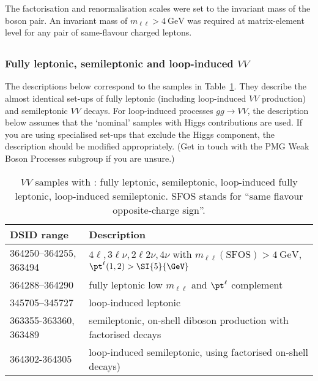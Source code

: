 The factorisation and renormalisation scales were set to the invariant mass of
the boson pair. An invariant mass of $m_{\ell\ell} > \SI{4}{\GeV}$ was required
at matrix-element level for any pair of same-flavour charged leptons.


\subsection[Sherpa]{\SHERPA}

\subsubsection{Fully leptonic, semileptonic and loop-induced \texorpdfstring{$VV$}{VV}}

The descriptions below correspond to the samples in
Table~\ref{tab:MB-sherpa}. They describe the almost
identical set-ups of fully leptonic (including loop-induced $VV$ production)
and semileptonic $VV$ decays. For loop-induced processes $gg\to VV$, 
the description below assumes that the `nominal' samples with 
Higgs contributions are used. If you are using specialised set-ups that
exclude the Higgs component, the description should be modified appropriately.
(Get in touch with the PMG Weak Boson Processes subgroup if you are unsure.)

\begin{table}[htbp]
  \caption{$VV$ samples with \SHERPA: fully leptonic, semileptonic,
    loop-induced fully leptonic, loop-induced semileptonic. SFOS stands for
    \enquote{same flavour opposite-charge sign}.}%
  \label{tab:MB-sherpa}
  \centering
  \begin{tabular}{l l}
    \toprule
    DSID range & Description \\
    \midrule
    364250--364255, 363494   & $4\ell, 3\ell\nu, 2\ell 2\nu, 4\nu$ with $m_{\ell\ell}\mathrm{(SFOS)} > \SI{4}{\GeV}$, $\pt^\ell(1,2) > \SI{5}{\GeV}$\\
    364288--364290 & fully leptonic low $m_{\ell\ell}$ and $\pt^\ell$ complement\\
    \midrule
    345705--345727   & loop-induced leptonic\\
    \midrule
    363355-363360, 363489   & semileptonic, on-shell diboson production with factorised decays\\
    \midrule
    364302-364305   & loop-induced semileptonic, using factorised on-shell decays)\\
    \bottomrule
  \end{tabular}
\end{table}

